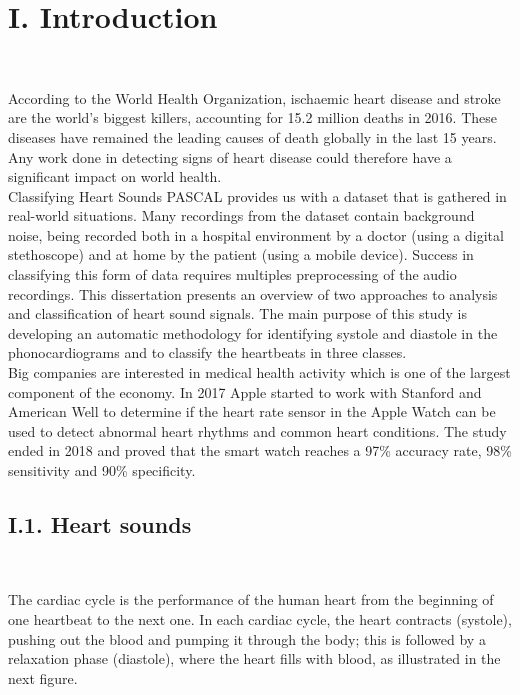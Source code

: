 \documentclass[11pt, a4papper]{report}
\theoremstyle{plain}
\theoremstyle{definition}
\theoremstyle{definition}
\theoremstyle{proposition}
\begin{document}
\tableofcontents

\newpage

\chapter*{I. Introduction}

\

According to the World Health Organization, ischaemic heart disease and stroke are the world’s biggest killers, accounting for 15.2 million deaths in 2016. These diseases have remained the leading causes of death globally in the last 15 years. \cite{1} Any work done in detecting signs of heart disease could therefore have a significant impact on world health.
\\

Classifying Heart Sounds PASCAL provides us with a dataset that is gathered in real-world situations. Many recordings from the dataset contain background noise, being recorded both in a hospital environment by a doctor (using a digital stethoscope) and at home by the patient (using a mobile device). Success in classifying this form of data requires multiples preprocessing of the audio recordings. \cite{2} This dissertation presents an overview of two approaches to analysis and classification of heart sound signals. The main purpose of this study is developing an automatic methodology for identifying systole and diastole in the phonocardiograms and to classify the heartbeats in three classes.
\\

Big companies are interested in medical health activity which is one of the largest component of the economy. In 2017 Apple started to work with Stanford and American Well to determine if the heart rate sensor in the Apple Watch can be used to detect abnormal heart rhythms and common heart conditions. The study ended in 2018 and proved that the smart watch reaches a 97\% accuracy rate, 98\% sensitivity and 90\% specificity. \cite{3}


\section*{I.1. Heart sounds}

\

The cardiac cycle is the performance of the human heart from the beginning of one heartbeat to the next one. In each cardiac cycle, the heart contracts (systole), pushing out the blood and pumping it through the body; this is followed by a relaxation phase (diastole), where the heart fills with blood, as illustrated in the next figure. 
\\
\end{document}
